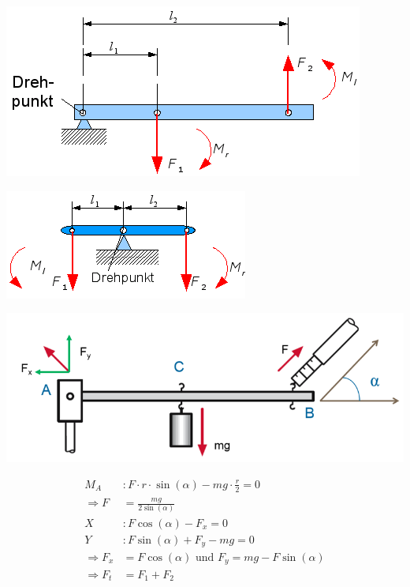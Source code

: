 \documentclass[
a4paper,
oneside,
landscape, 
8pt,
]{scrartcl}
\begin{document}
\begin{multicols*}{2}
\begin{minipage}[h!]{0.5\linewidth}
	\includegraphics[width=0.8\linewidth]{images/hebel_einseitig}
\end{minipage}
\hfill
\begin{minipage}[h!]{0.5\linewidth}
	\includegraphics[width=0.8\linewidth]{images/hebel_zweiseitig}
\end{minipage}



\begin{minipage}[h!]{0.5\linewidth}
\includegraphics[width=0.9\linewidth]{images/hebel}
\end{minipage}
\hfill
\begin{minipage}[h!]{0.5\linewidth}
	
	\begin{align*}
	M_A &:	F  \cdot r \cdot  \sin(\alpha) - m g \cdot \frac{r}{2} = 0 \\
	\Rightarrow F &= \frac{mg}{2 \sin(\alpha)} \\
	X&:	F \cos(\alpha) - F_x = 0 \\ 
	Y&:	F \sin(\alpha) + F_y - m g = 0 \\ 
	\Rightarrow F_x &= F \cos(\alpha) \text{ und } F_y = mg - F \sin(\alpha) \\
	\Rightarrow F_{t} &= F_1 + F_2 \\
	\end{align*}
	

\end{minipage}
\end{multicols*}
\end{document}
